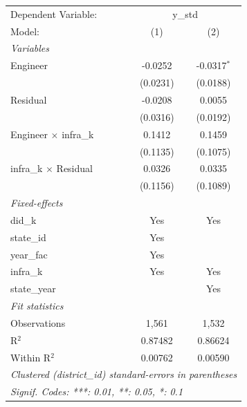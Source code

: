 
\begingroup
\centering
\begin{tabular}{lcc}
   \tabularnewline \midrule \midrule
   Dependent Variable: & \multicolumn{2}{c}{y\_std}\\
   Model:                       & (1)      & (2)\\  
   \midrule
   \emph{Variables}\\
   Engineer                     & -0.0252  & -0.0317$^{*}$\\   
                                & (0.0231) & (0.0188)\\   
   Residual                     & -0.0208  & 0.0055\\   
                                & (0.0316) & (0.0192)\\   
   Engineer $\times$ infra\_k   & 0.1412   & 0.1459\\   
                                & (0.1135) & (0.1075)\\   
   infra\_k $\times$ Residual   & 0.0326   & 0.0335\\   
                                & (0.1156) & (0.1089)\\   
   \midrule
   \emph{Fixed-effects}\\
   did\_k                       & Yes      & Yes\\  
   state\_id                    & Yes      & \\  
   year\_fac                    & Yes      & \\  
   infra\_k                     & Yes      & Yes\\  
   state\_year                  &          & Yes\\  
   \midrule
   \emph{Fit statistics}\\
   Observations                 & 1,561    & 1,532\\  
   R$^2$                        & 0.87482  & 0.86624\\  
   Within R$^2$                 & 0.00762  & 0.00590\\  
   \midrule \midrule
   \multicolumn{3}{l}{\emph{Clustered (district\_id) standard-errors in parentheses}}\\
   \multicolumn{3}{l}{\emph{Signif. Codes: ***: 0.01, **: 0.05, *: 0.1}}\\
\end{tabular}
\par\endgroup


